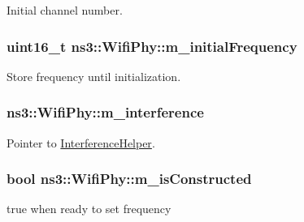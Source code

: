 Initial channel number. 

\subsubsection[{\texorpdfstring{m\+\_\+initial\+Frequency}{m_initialFrequency}}]{\setlength{\rightskip}{0pt plus 5cm}uint16\+\_\+t ns3\+::\+Wifi\+Phy\+::m\+\_\+initial\+Frequency\hspace{0.3cm}{\ttfamily [private]}}\hypertarget{classns3_1_1WifiPhy_a599d1a4cbb27e5a9f4dbef69d29c5b5a}{}\label{classns3_1_1WifiPhy_a599d1a4cbb27e5a9f4dbef69d29c5b5a}


Store frequency until initialization. 

\subsubsection[{\texorpdfstring{m\+\_\+interference}{m_interference}}]{ ns3\+::\+Wifi\+Phy\+::m\+\_\+interference\hspace{0.3cm}{\ttfamily [protected]}}\hypertarget{classns3_1_1WifiPhy_a55909109ad2e2759702336770fa90119}{}\label{classns3_1_1WifiPhy_a55909109ad2e2759702336770fa90119}


Pointer to \hyperlink{classns3_1_1InterferenceHelper}{Interference\+Helper}. 

\subsubsection[{\texorpdfstring{m\+\_\+is\+Constructed}{m_isConstructed}}]{\setlength{\rightskip}{0pt plus 5cm}bool ns3\+::\+Wifi\+Phy\+::m\+\_\+is\+Constructed\hspace{0.3cm}{\ttfamily [private]}}\hypertarget{classns3_1_1WifiPhy_a61f888ec1fe29d38d206df607596161f}{}\label{classns3_1_1WifiPhy_a61f888ec1fe29d38d206df607596161f}


true when ready to set frequency 

